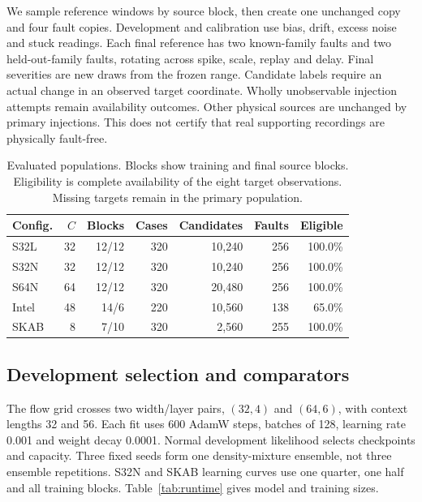 \documentclass[conference]{IEEEtran}
\newcommand{\1}{\mathbf{1}}
\begin{document}
We sample reference windows by source block, then create one unchanged copy and four fault copies. Development and calibration use bias, drift, excess noise and stuck readings. Each final reference has two known-family faults and two held-out-family faults, rotating across spike, scale, replay and delay. Final severities are new draws from the frozen range. Candidate labels require an actual change in an observed target coordinate. Wholly unobservable injection attempts remain availability outcomes. Other physical sources are unchanged by primary injections. This does not certify that real supporting recordings are physically fault-free.

\begin{table}[t]
\centering
\caption{Evaluated populations. Blocks show training and final source blocks. Eligibility is complete availability of the eight target observations. Missing targets remain in the primary population.}
\label{tab:data}
\small
\begin{tabular}{lrrrrrr}
\toprule
Config. & $C$ & Blocks & Cases & Candidates & Faults & Eligible \\
\midrule
S32L & 32 & 12/12 & 320 & 10,240 & 256 & 100.0\% \\
S32N & 32 & 12/12 & 320 & 10,240 & 256 & 100.0\% \\
S64N & 64 & 12/12 & 320 & 20,480 & 256 & 100.0\% \\
Intel & 48 & 14/6 & 220 & 10,560 & 138 & 65.0\% \\
SKAB & 8 & 7/10 & 320 & 2,560 & 255 & 100.0\% \\
\bottomrule
\end{tabular}
\end{table}

\subsection{Development selection and comparators}
The flow grid crosses two width/layer pairs, $(32,4)$ and $(64,6)$, with context lengths 32 and 56. Each fit uses 600 AdamW steps, batches of 128, learning rate 0.001 and weight decay 0.0001. Normal development likelihood selects checkpoints and capacity. Three fixed seeds form one density-mixture ensemble, not three ensemble repetitions. S32N and SKAB learning curves use one quarter, one half and all training blocks. Table~\ref{tab:runtime} gives model and training sizes.
\end{document}
